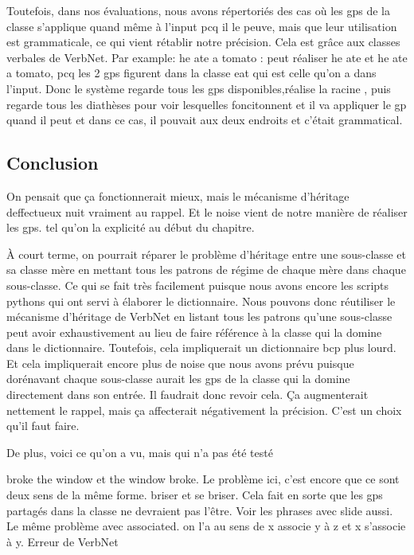 Toutefois, dans nos évaluations, nous avons répertoriés des cas où les gps de la classe s'applique quand même à l'input pcq il le peuve, mais que leur utilisation est grammaticale, ce qui vient rétablir notre précision. Cela est grâce aux classes verbales de VerbNet. Par example: he ate a tomato : peut réaliser he ate et he ate a tomato, pcq les 2 gps figurent dans la classe eat qui est celle qu'on a dans l'input. Donc le système regarde tous les gps disponibles,réalise la racine , puis regarde tous les diathèses pour voir lesquelles foncitonnent et il va appliquer le gp quand il peut et dans ce cas, il pouvait aux deux endroits et c'était grammatical. 

\subsection{Conclusion}
On pensait que ça fonctionnerait mieux, mais le mécanisme d'héritage deffectueux nuit vraiment au rappel. Et le noise vient de notre manière de réaliser les gps. tel qu'on la explicité au début du chapitre.

À court terme, on pourrait réparer le problème d'héritage entre une sous-classe et sa classe mère en mettant tous les patrons de régime de chaque mère dans chaque sous-classe. Ce qui se fait très facilement puisque nous avons encore les scripts pythons qui ont servi à élaborer le dictionnaire. Nous pouvons donc réutiliser le mécanisme d'héritage de VerbNet en listant tous les patrons qu'une sous-classe peut avoir exhaustivement au lieu de faire référence à la classe qui la domine dans le dictionnaire. Toutefois, cela impliquerait un dictionnaire bcp plus lourd. Et cela impliquerait encore plus de noise que nous avons prévu puisque dorénavant chaque sous-classe aurait les gps de la classe qui la domine directement dans son entrée. Il faudrait donc revoir cela. Ça augmenterait nettement le rappel, mais ça affecterait négativement la précision. C'est un choix qu'il faut faire. 

De plus, voici ce qu'on a vu, mais qui n'a pas été testé

broke the window et the window broke. Le problème ici, c'est encore que ce sont deux sens de la même forme. briser et se briser. Cela fait en sorte que les gps partagés dans la classe ne devraient pas l'être. Voir les phrases avec slide aussi. Le même problème avec associated. on l'a au sens de x associe y à z et x s'associe à y. Erreur de VerbNet

